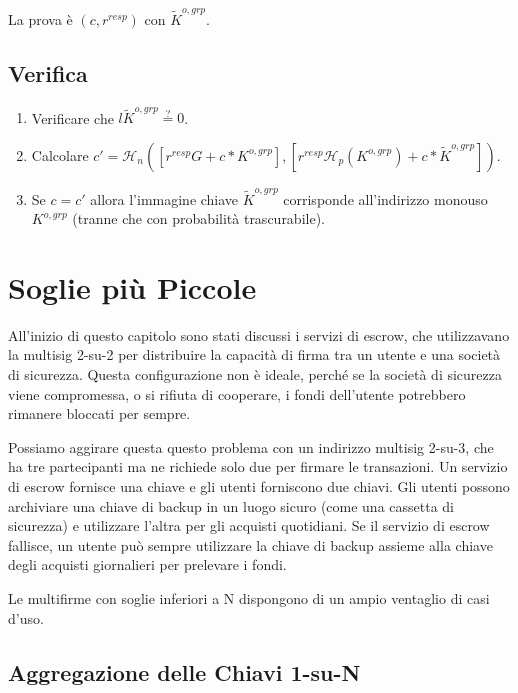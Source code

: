La prova è $(c,r^{resp})$ con $\tilde{K}^{o,grp}$.


\subsection*{Verifica}

\begin{enumerate}
    \item Verificare che $l \tilde{K}^{o,grp} \stackrel{?}{=} 0$.
    \item Calcolare $c' = \mathcal{H}_n([r^{resp} G + c*K^{o,grp}],[r^{resp} \mathcal{H}_p(K^{o,grp}) + c*\tilde{K}^{o,grp}])$.
    \item Se $c = c'$ allora l'immagine chiave $\tilde{K}^{o,grp}$ corrisponde all'indirizzo monouso $K^{o,grp}$ (tranne che con probabilità trascurabile).
\end{enumerate}


    
\section{Soglie più Piccole}
\label{sec:smaller-thresholds}

All'inizio di questo capitolo sono stati discussi i servizi di escrow, che utilizzavano la multisig 2-su-2 per distribuire la capacità di firma tra un utente e una società di sicurezza. Questa configurazione non è ideale, perché se la società di sicurezza viene compromessa, o si rifiuta di cooperare, i fondi dell'utente potrebbero rimanere bloccati per sempre.

Possiamo aggirare questa questo problema con un indirizzo multisig 2-su-3, che ha tre partecipanti ma ne richiede solo due per firmare le transazioni. Un servizio di escrow fornisce una chiave e gli utenti forniscono due chiavi. Gli utenti possono archiviare una chiave di backup in un luogo sicuro (come una cassetta di sicurezza) e utilizzare l'altra per gli acquisti quotidiani. Se il servizio di escrow fallisce, un utente può sempre utilizzare la chiave di backup assieme alla chiave degli acquisti giornalieri per prelevare i fondi.

Le multifirme con soglie inferiori a N dispongono di un ampio ventaglio di casi d'uso.


\subsection{Aggregazione delle Chiavi 1-su-N}
\label{sec:1-of-n}

